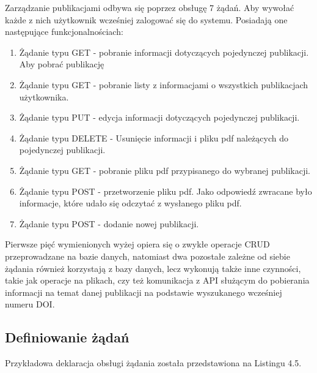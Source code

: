 \documentclass[a4paper,12pt,twoside,openany]{report}
\begin{document}
Zarządzanie publikacjami odbywa się poprzez obsługę 7 żądań. Aby wywołać każde z nich użytkownik wcześniej zalogować się do systemu. Posiadają one następujące funkcjonalnościach:
\begin{enumerate}
	
	\item Żądanie typu GET - pobranie informacji dotyczących pojedynczej publikacji. Aby pobrać publikację 
	
	\item Żądanie typu GET - pobranie listy z informacjami o wszystkich publikacjach użytkownika. 
		
	\item Żądanie typu PUT - edycja informacji dotyczących pojedynczej publikacji.
	
	\item Żądanie typu DELETE - Usunięcie informacji i pliku pdf należących do pojedynczej publikacji.
	
	\item Żądanie typu GET - pobranie pliku pdf przypisanego do wybranej publikacji.
	
	\item Żądanie typu POST - przetworzenie pliku pdf. Jako odpowiedź zwracane było informacje, które udało się odczytać z wysłanego pliku pdf.
	
	\item Żądanie typu POST - dodanie nowej publikacji.
\end{enumerate}
\pagebreak
Pierwsze pięć wymienionych wyżej opiera się o zwykłe operacje CRUD przeprowadzane na bazie danych, natomiast dwa pozostałe zależne od siebie żądania również korzystają z bazy danych, lecz wykonują także inne czynności, takie jak operacje na plikach, czy też komunikacja z API służącym do pobierania informacji na temat danej publikacji na podstawie wyszukanego wcześniej numeru DOI.


\subsection{Definiowanie żądań}

Przykładowa deklaracja obsługi żądania została przedstawiona na Listingu 4.5.
\end{document}
